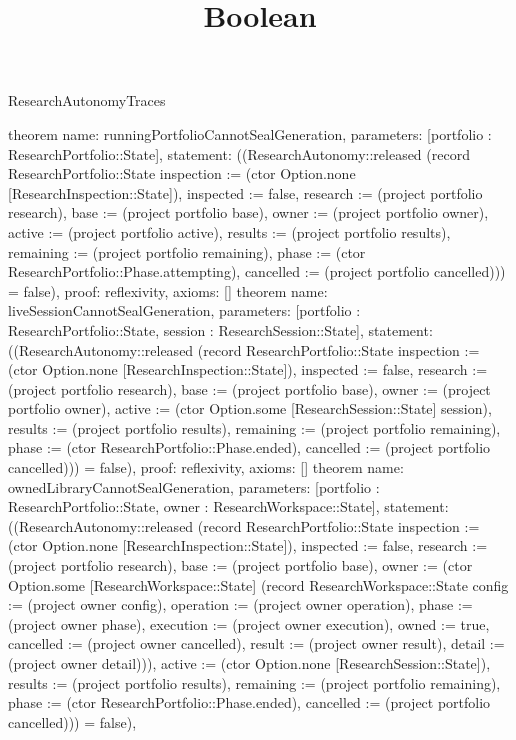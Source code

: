 \begin{lexlean}{ResearchAutonomyTraces}
\title{Boolean}
\begin{semanticmodule}
theorem{
 name: runningPortfolioCannotSealGeneration,
 parameters: [portfolio : ResearchPortfolio::State],
 statement: ((ResearchAutonomy::released (record ResearchPortfolio::State {inspection := (ctor Option.none [ResearchInspection::State]), inspected := false, research := (project portfolio research), base := (project portfolio base), owner := (project portfolio owner), active := (project portfolio active), results := (project portfolio results), remaining := (project portfolio remaining), phase := (ctor ResearchPortfolio::Phase.attempting), cancelled := (project portfolio cancelled)})) = false),
 proof: reflexivity{},
 axioms: []
}
theorem{
 name: liveSessionCannotSealGeneration,
 parameters: [portfolio : ResearchPortfolio::State, session : ResearchSession::State],
 statement: ((ResearchAutonomy::released (record ResearchPortfolio::State {inspection := (ctor Option.none [ResearchInspection::State]), inspected := false, research := (project portfolio research), base := (project portfolio base), owner := (project portfolio owner), active := (ctor Option.some [ResearchSession::State] session), results := (project portfolio results), remaining := (project portfolio remaining), phase := (ctor ResearchPortfolio::Phase.ended), cancelled := (project portfolio cancelled)})) = false),
 proof: reflexivity{},
 axioms: []
}
theorem{
 name: ownedLibraryCannotSealGeneration,
 parameters: [portfolio : ResearchPortfolio::State, owner : ResearchWorkspace::State],
 statement: ((ResearchAutonomy::released (record ResearchPortfolio::State {inspection := (ctor Option.none [ResearchInspection::State]), inspected := false, research := (project portfolio research), base := (project portfolio base), owner := (ctor Option.some [ResearchWorkspace::State] (record ResearchWorkspace::State {config := (project owner config), operation := (project owner operation), phase := (project owner phase), execution := (project owner execution), owned := true, cancelled := (project owner cancelled), result := (project owner result), detail := (project owner detail)})), active := (ctor Option.none [ResearchSession::State]), results := (project portfolio results), remaining := (project portfolio remaining), phase := (ctor ResearchPortfolio::Phase.ended), cancelled := (project portfolio cancelled)})) = false),
}
\end{semanticmodule}
\end{lexlean}
